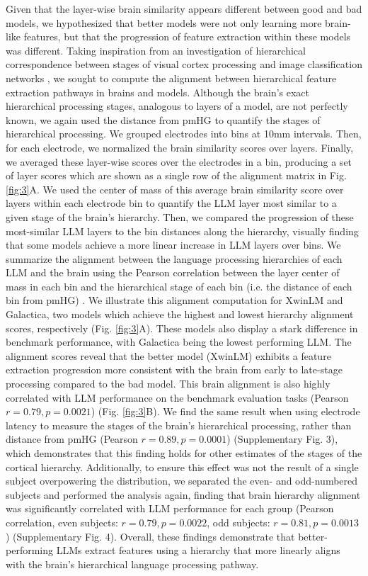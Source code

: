 Given that the layer-wise brain similarity appears different between good and bad models, we hypothesized that better models were not only learning more brain-like features, but that the progression of feature extraction within these models was different. Taking inspiration from an investigation of hierarchical correspondence between stages of visual cortex processing and image classification networks \cite{nonaka2021brain}, we sought to compute the alignment between hierarchical feature extraction pathways in brains and models. Although the brain's exact hierarchical processing stages, analogous to layers of a model, are not perfectly known, we again used the distance from pmHG to quantify the stages of hierarchical processing. We grouped electrodes into bins at 10mm intervals. Then, for each electrode, we normalized the brain similarity scores over layers. Finally, we averaged these layer-wise scores over the electrodes in a bin, producing a set of layer scores which are shown as a single row of the alignment matrix in Fig. \ref{fig:3}A. We used the center of mass of this average brain similarity score over layers within each electrode bin to quantify the LLM layer most similar to a given stage of the brain's hierarchy. Then, we compared the progression of these most-similar LLM layers to the bin distances along the hierarchy, visually finding that some models achieve a more linear increase in LLM layers over bins. We summarize the alignment between the language processing hierarchies of each LLM and the brain using the Pearson correlation between the layer center of mass in each bin and the hierarchical stage of each bin (i.e. the distance of each bin from pmHG) \cite{nonaka2021brain}. We illustrate this alignment computation for XwinLM and Galactica, two models which achieve the highest and lowest hierarchy alignment scores, respectively (Fig. \ref{fig:3}A). These models also display a stark difference in benchmark performance, with Galactica being the lowest performing LLM. The alignment scores reveal that the better model (XwinLM) exhibits a feature extraction progression more consistent with the brain from early to late-stage processing compared to the bad model.  This brain alignment is also highly correlated with LLM performance on the benchmark evaluation tasks (Pearson $r=0.79, p=0.0021$) (Fig. \ref{fig:3}B). We find the same result when using electrode latency to measure the stages of the brain's hierarchical processing, rather than distance from pmHG (Pearson $r=0.89, p=0.0001$) (Supplementary Fig. 3), which demonstrates that this finding holds for other estimates of the stages of the cortical hierarchy. Additionally, to ensure this effect was not the result of a single subject overpowering the distribution, we separated the even- and odd-numbered subjects and performed the analysis again, finding that brain hierarchy alignment was significantly correlated with LLM performance for each group (Pearson correlation, even subjects: $r=0.79, p=0.0022$, odd subjects: $r=0.81, p=0.0013$) (Supplementary Fig. 4). Overall, these findings demonstrate that better-performing LLMs extract features using a hierarchy that more linearly aligns with the brain's hierarchical language processing pathway.

